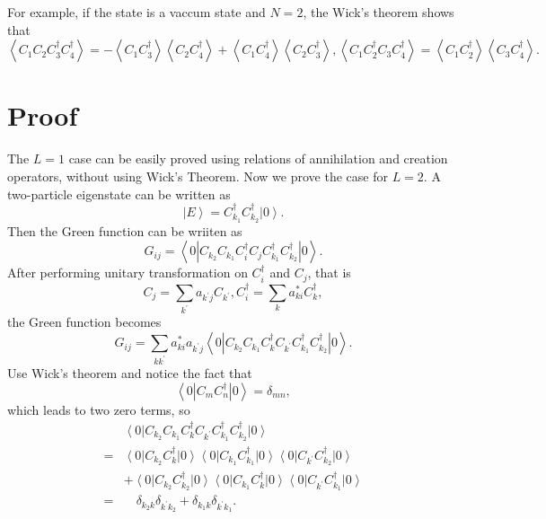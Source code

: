 \documentclass[prb,superscriptaddress,letter,10pt,onecolumn]{revtex4}
\begin{document}
For example, if the state is a vaccum state and $N=2$, the Wick's theorem shows that
\begin{equation}
	\left< C_1 C_2 C_3^\dagger C_4^\dagger \right> =
	-\left< C_1 C_3^\dagger\right>\left< C_2 C_4^\dagger\right>
	+\left< C_1 C_4^\dagger\right>\left< C_2 C_3^\dagger\right>, 
	\left< C_1 C_2^\dagger C_3 C_4^\dagger \right> =
	\left< C_1 C_2^\dagger\right>\left< C_3 C_4^\dagger\right>.
\end{equation}

\section{Proof}

The $L=1$ case can be easily proved using relations of annihilation and creation operators, without using Wick's Theorem.
Now we prove the case for $L=2$.
A two-particle eigenstate can be written as
\begin{equation}
	\left|E\right> = C_{k_1}^\dagger C_{k_2}^\dagger\left|0\right>.
\end{equation}
Then the Green function can be wriiten as
\begin{equation}
	G_{ij} = 
	\left< 0 \left| C_{k_2}C_{k_1}  C_i^\dagger C_j
	C_{k_1}^\dagger C_{k_2}^\dagger\right|0\right>.
\end{equation}
After performing unitary transformation on $C_i^\dagger$ and $C_j$, that is
\begin{equation}
	C_j = \sum_{k^{'}}a_{k^{'}j} C_{k^{'}},
	C_i^\dagger = \sum_{k}a_{ki}^* C_k^\dagger,
\end{equation}
the Green function becomes
\begin{equation}
	G_{ij} = \sum_{kk^{'}} a_{ki}^* a_{k^{'}j}
	\left< 0 \left| C_{k_2}C_{k_1}  C_k^\dagger C_{k^{'}}
	C_{k_1}^\dagger C_{k_2}^\dagger \right|0\right>.
\end{equation}
Use Wick's theorem and notice the fact that
\begin{equation}
	\left< 0 \left| C_m C_n^\dagger \right| 0 \right> = \delta_{mn},
\end{equation}
which leads to two zero terms, so
\begin{equation}
	\begin{aligned}
	&\left< 0 \right| C_{k_2}C_{k_1}  C_k^\dagger C_{k^{'}}
	C_{k_1}^\dagger C_{k_2}^\dagger\left|0\right> \\
	= &\left< 0 \right| C_{k_2} C_k^\dagger \left| 0 \right>
	\left< 0 \right| C_{k_1} C_{k_1}^\dagger \left| 0 \right>
	\left< 0 \right| C_{k^{'}} C_{k_2}^\dagger \left| 0 \right> \\
	&+ \left< 0 \right| C_{k_2} C_{k_2}^\dagger \left| 0 \right> 
	\left< 0 \right| C_{k_1} C_{k}^\dagger \left| 0 \right>
	\left< 0 \right| C_{k^{'}} C_{k_1}^\dagger \left| 0 \right> \\
	= & \quad\delta_{k_2 k} \delta_{k^{'}k_2} + \delta_{k_1 k} \delta_{k^{'}k_1}.
	\end{aligned}		
\end{equation}
\end{document}
